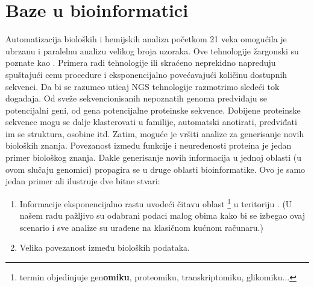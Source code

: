 \chapter{Baze u bioinformatici} %

\label{Baze} %


Automatizacija bioloških i hemijskih analiza početkom 21 veka omogućila je
ubrzanu i paralelnu analizu velikog broja uzoraka. Ove tehnologije žargonski su
poznate kao  . Primera radi tehnologije 
 ili skraćeno  neprekidno napreduju
spuštajući cenu procedure i eksponencijalno povećavajući količinu dostupnih
sekvenci. Da bi se razumeo uticaj NGS tehnologije razmotrimo sledeći tok
događaja.  Od sveže sekvencionisanih nepoznatih genoma predviđaju se
potencijalni geni, od gena potencijalne proteinske sekvence.  Dobijene
proteinske sekvence mogu se dalje klasterovati u familije, automatski
anotirati, predviđati im se struktura, osobine itd.  Zatim, moguće je vršiti
analize za generisanje novih bioloških znanja. Povezanost između funkcije i
neuređenosti proteina je jedan primer biološkog znanja. Dakle generisanje novih
informacija u jednoj oblasti (u ovom slučaju genomici) propagira se u druge
oblasti bioinformatike. Ovo je samo jedan primer ali ilustruje dve bitne stvari:
\begin{enumerate}
  \item Informacije eksponencijalno rastu uvodeći čitavu oblast
    \footnote{termin objedinjuje gen\textbf{omiku}, proteomiku,
    transkriptomiku, glikomiku...}   u teritoriju  \parencite{Chen2017}. (U našem radu pažljivo su odabrani podaci malog
  obima kako bi se izbegao ovaj scenario i sve analize su urađene na klasičnom
  kućnom računaru.)
  \item Velika povezanost između bioloških podataka.
\end{enumerate}

